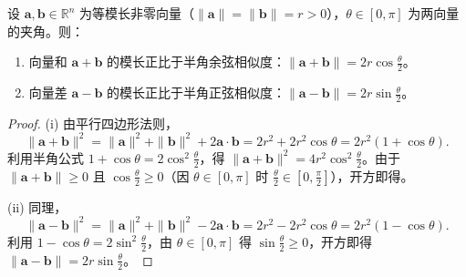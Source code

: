 \begin{proposition}\label{prop:sum_difference_half_angle}
设 $\mathbf{a}, \mathbf{b} \in \mathbb{R}^n$ 为等模长非零向量（$\|\mathbf{a}\| = \|\mathbf{b}\| = r>0$），$\theta \in [0,\pi]$ 为两向量的夹角。则：
\begin{enumerate}[label=(\roman*)]
    \item 向量和 $\mathbf{a} + \mathbf{b}$ 的模长正比于半角余弦相似度：$\|\mathbf{a} + \mathbf{b}\| = 2r\cos\frac{\theta}{2}$。
    \item 向量差 $\mathbf{a} - \mathbf{b}$ 的模长正比于半角正弦相似度：$\|\mathbf{a} - \mathbf{b}\| = 2r\sin\frac{\theta}{2}$。
\end{enumerate}
\end{proposition}

\begin{proof}
(i) 由平行四边形法则，
\[\|\mathbf{a} + \mathbf{b}\|^2 = \|\mathbf{a}\|^2 + \|\mathbf{b}\|^2 + 2\mathbf{a}\cdot\mathbf{b} = 2r^2 + 2r^2\cos\theta = 2r^2(1 + \cos\theta).\]
利用半角公式 $1 + \cos\theta = 2\cos^2\frac{\theta}{2}$，得 $\|\mathbf{a} + \mathbf{b}\|^2 = 4r^2\cos^2\frac{\theta}{2}$。由于 $\|\mathbf{a} + \mathbf{b}\| \ge 0$ 且 $\cos\frac{\theta}{2} \ge 0$（因 $\theta \in [0,\pi]$ 时 $\frac{\theta}{2} \in [0,\frac{\pi}{2}]$），开方即得。

(ii) 同理，
\[\|\mathbf{a} - \mathbf{b}\|^2 = \|\mathbf{a}\|^2 + \|\mathbf{b}\|^2 - 2\mathbf{a}\cdot\mathbf{b} = 2r^2 - 2r^2\cos\theta = 2r^2(1 - \cos\theta).\]
利用 $1 - \cos\theta = 2\sin^2\frac{\theta}{2}$，由 $\theta\in[0,\pi]$ 得 $\sin\frac{\theta}{2}\ge0$，开方即得 $\|\mathbf{a}-\mathbf{b}\|=2r\sin\frac{\theta}{2}$。
\end{proof}

